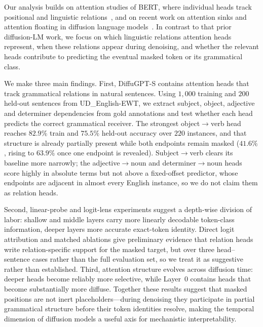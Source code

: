 \documentclass{article} %
\begin{document}
Our analysis builds on attention studies of BERT, where individual heads track positional and linguistic relations~\citep{clark-etal-2019-bert,tenney-etal-2019-bert}, and on recent work on attention sinks and attention floating in diffusion language models~\citep{DBLP:journals/corr/abs-2510-15731,dai2026revealingattentionfloatingmechanism}. In contrast to that prior diffusion-LM work, we focus on which linguistic relations attention heads represent, when these relations appear during denoising, and whether the relevant heads contribute to predicting the eventual masked token or its grammatical class.

We make three main findings. First, DiffuGPT-S contains attention heads that track grammatical relations in natural sentences. Using $1{,}000$ training and $200$ held-out sentences from UD\_English-EWT, we extract subject, object, adjective and determiner dependencies from gold annotations and test whether each head predicts the correct grammatical receiver. The strongest object$\to$verb head reaches $82.9\%$ train and $75.5\%$ held-out accuracy over $220$ instances, and that structure is already partially present while both endpoints remain masked ($41.6\%$, rising to $63.9\%$ once one endpoint is revealed). Subject$\to$verb clears its baseline more narrowly; the adjective$\to$noun and determiner$\to$noun heads score highly in absolute terms but not above a fixed-offset predictor, whose endpoints are adjacent in almost every English instance, so we do not claim them as relation heads.

Second, linear-probe and logit-lens experiments suggest a depth-wise division of labor: shallow and middle layers carry more linearly decodable token-class information, deeper layers more accurate exact-token identity. Direct logit attribution and matched ablations give preliminary evidence that relation heads write relation-specific support for the masked target, but over three head--sentence cases rather than the full evaluation set, so we treat it as suggestive rather than established. Third, attention structure evolves across diffusion time: deeper heads become reliably more selective, while Layer~0 contains heads that become substantially more diffuse. Together these results suggest that masked positions are not inert placeholders---during denoising they participate in partial grammatical structure before their token identities resolve, making the temporal dimension of diffusion models a useful axis for mechanistic interpretability.
\end{document}
